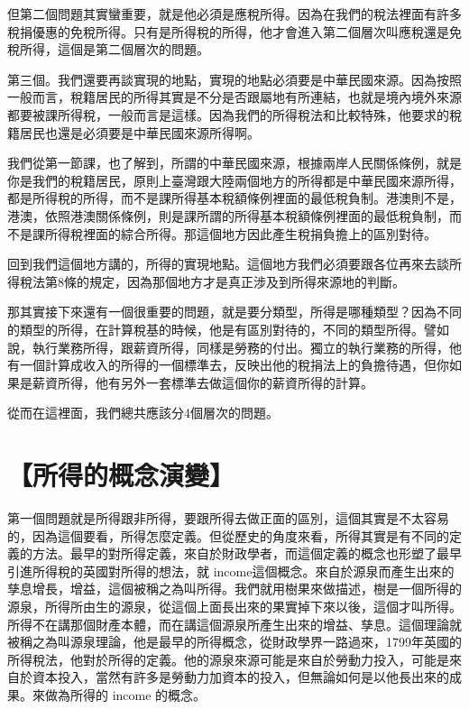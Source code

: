 \documentclass[]{ctexbook}
\begin{document}
但第二個問題其實蠻重要，就是他必須是應稅所得。因為在我們的稅法裡面有許多稅捐優惠的免稅所得。只有是所得稅的所得，他才會進入第二個層次叫應稅還是免稅所得，這個是第二個層次的問題。

第三個。我們還要再談實現的地點，實現的地點必須要是中華民國來源。因為按照一般而言，稅籍居民的所得其實是不分是否跟屬地有所連結，也就是境內境外來源都要被課所得稅，一般而言是這樣。因為我們的所得稅法和比較特殊，他要求的稅籍居民也還是必須要是中華民國來源所得啊。

我們從第一節課，也了解到，所謂的中華民國來源，根據兩岸人民關係條例，就是你是我們的稅籍居民，原則上臺灣跟大陸兩個地方的所得都是中華民國來源所得，都是所得稅的所得，而不是課所得基本稅額條例裡面的最低稅負制。港澳則不是，港澳，依照港澳關係條例，則是課所謂的所得基本稅額條例裡面的最低稅負制，而不是課所得稅裡面的綜合所得。那這個地方因此產生稅捐負擔上的區別對待。

回到我們這個地方講的，所得的實現地點。這個地方我們必須要跟各位再來去談所得稅法第8條的規定，因為那個地方才是真正涉及到所得來源地的判斷。

那其實接下來還有一個很重要的問題，就是要分類型，所得是哪種類型？因為不同的類型的所得，在計算稅基的時候，他是有區別對待的，不同的類型所得。譬如說，執行業務所得，跟薪資所得，同樣是勞務的付出。獨立的執行業務的所得，他有一個計算成收入的所得的一個標準去，反映出他的稅捐法上的負擔待遇，但你如果是薪資所得，他有另外一套標準去做這個你的薪資所得的計算。

從而在這裡面，我們總共應該分4個層次的問題。

\hypertarget{ux6240ux5f97ux7684ux6982ux5ff5ux6f14ux8b8a}{%
\section{【所得的概念演變】}\label{ux6240ux5f97ux7684ux6982ux5ff5ux6f14ux8b8a}}

第一個問題就是所得跟非所得，要跟所得去做正面的區別，這個其實是不太容易的，因為這個要看，所得怎麼定義。但從歷史的角度來看，所得其實是有不同的定義的方法。最早的對所得定義，來自於財政學者，而這個定義的概念也形塑了最早引進所得稅的英國對所得的想法，就 income這個概念。來自於源泉而產生出來的孳息增長，增益，這個被稱之為叫所得。我們就用樹果來做描述，樹是一個所得的源泉，所得所由生的源泉，從這個上面長出來的果實掉下來以後，這個才叫所得。所得不在講那個財產本體，而在講這個源泉所產生出來的增益、孳息。這個理論就被稱之為叫源泉理論，他是最早的所得概念，從財政學界一路過來，1799年英國的所得稅法，他對於所得的定義。他的源泉來源可能是來自於勞動力投入，可能是來自於資本投入，當然有許多是勞動力加資本的投入，但無論如何是以他長出來的成果。來做為所得的 income 的概念。
\end{document}
